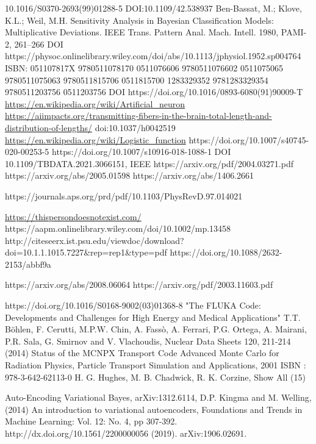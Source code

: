 \begin{thebibliography}{99}

 10.1016/S0370-2693(99)01288-5
 DOI:10.1109/42.538937
 Ben-Bassat, M.; Klove, K.L.; Weil, M.H. Sensitivity Analysis in Bayesian Classification Models: Multiplicative Deviations. IEEE Trans. Pattern Anal. Mach. Intell. 1980, PAMI-2, 261–266
  DOI https://physoc.onlinelibrary.wiley.com/doi/abs/10.1113/jphysiol.1952.sp004764
  ISBN:	051107817X 9780511078170 0511076606 9780511076602 0511075065 9780511075063 9780511815706 0511815700 1283329352 9781283329354 9780511203756 0511203756
 DOI https://doi.org/10.1016/0893-6080(91)90009-T
 \url{https://en.wikipedia.org/wiki/Artificial_neuron}
 \url{https://aiimpacts.org/transmitting-fibers-in-the-brain-total-length-and-distribution-of-lengths/}
 doi:10.1037/h0042519
 \url{https://en.wikipedia.org/wiki/Logistic_function}
 https://doi.org/10.1007/s40745-020-00253-5
https://doi.org/10.1007/s10916-018-1088-1
  DOI 10.1109/TBDATA.2021.3066151, IEEE
 https://arxiv.org/pdf/2004.03271.pdf
 https://arxiv.org/abs/2005.01598
 https://arxiv.org/abs/1406.2661

 https://journals.aps.org/prd/pdf/10.1103/PhysRevD.97.014021

 \url{https://thispersondoesnotexist.com/}
 https://aapm.onlinelibrary.wiley.com/doi/10.1002/mp.13458
 http://citeseerx.ist.psu.edu/viewdoc/download?doi=10.1.1.1015.7227&rep=rep1&type=pdf
 https://doi.org/10.1088/2632-2153/abbf9a


 https://arxiv.org/abs/2008.06064
 https://arxiv.org/pdf/2003.11603.pdf


 https://doi.org/10.1016/S0168-9002(03)01368-8
 "The FLUKA Code: Developments and Challenges for High Energy and Medical Applications" T.T. Böhlen, F. Cerutti, M.P.W. Chin, A. Fassò, A. Ferrari, P.G. Ortega, A. Mairani, P.R. Sala, G. Smirnov and V. Vlachoudis, Nuclear Data Sheets 120, 211-214 (2014)
 Status of the MCNPX Transport Code Advanced Monte Carlo for Radiation Physics, Particle Transport Simulation and Applications, 2001 ISBN : 978-3-642-62113-0 H. G. Hughes, M. B. Chadwick, R. K. Corzine, Show All (15)

 Auto-Encoding Variational Bayes, arXiv:1312.6114, D.P. Kingma and M. Welling, (2014)
 An introduction to variational autoencoders, Foundations and Trends in Machine Learning: Vol. 12: No. 4, pp 307-392. http://dx.doi.org/10.1561/2200000056 (2019). arXiv:1906.02691.
\end{thebibliography}